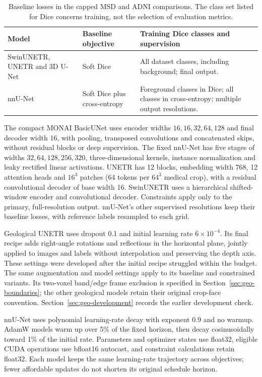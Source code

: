 \documentclass[12pt,a4paper]{article}
\begin{document}
\begin{table}[htbp]
\centering
\small
\begin{tabular}{P{4.3cm}P{3.2cm}P{6.0cm}}
\hline
Model & Baseline objective & Training Dice classes and supervision \\
\hline
SwinUNETR, UNETR and 3D U-Net
& Soft Dice
& All dataset classes, including background; final output. \\[0.5em]
nnU-Net
& Soft Dice plus cross-entropy
& Foreground classes in Dice; all classes in cross-entropy;
  multiple output resolutions. \\
\hline
\end{tabular}
\caption{Baseline losses in the capped MSD and ADNI comparisons. The class set
listed for Dice concerns training, not the selection of evaluation metrics.}
\label{tab:capped-baseline-losses}
\end{table}

The compact MONAI BasicUNet uses encoder widths $16,16,32,64,128$
and final decoder width 16, with pooling, transposed convolutions and
concatenated skips, without residual blocks or deep supervision.
The fixed nnU-Net has five stages of widths $32,64,128,256,320$,
three-dimensional kernels, instance normalization and leaky rectified
linear activations. UNETR has 12 blocks, embedding width 768, 12
attention heads and $16^3$ patches (64 tokens per $64^3$ medical crop),
with a residual convolutional decoder of base width 16. SwinUNETR
uses a hierarchical shifted-window encoder and convolutional decoder.
Constraints apply only to the primary, full-resolution output.
nnU-Net's other supervised resolutions keep their baseline losses, with
reference labels resampled to each grid.

Geological UNETR uses dropout 0.1 and initial learning rate
$6\times10^{-4}$. Its final recipe adds right-angle rotations and
reflections in the horizontal plane, jointly applied to images and
labels without interpolation and preserving the depth axis. These
settings were developed after the initial recipe struggled within the
budget. The same augmentation and model settings apply to its baseline
and constrained variants. Its two-voxel band/edge frame exclusion is
specified in Section~\ref{sec:geo-boundaries}; the other geological
models retain their original crop-face convention.
Section~\ref{sec:geo-development} records the earlier development check.

nnU-Net uses polynomial learning-rate decay with exponent 0.9 and no
warmup. AdamW models warm up over 5\% of the fixed horizon, then decay
cosinusoidally toward 1\% of the initial rate. Parameters and optimizer
states use float32, eligible CUDA operations use bfloat16 autocast,
and constraint calculations retain float32. Each model keeps the same
learning-rate trajectory across objectives; fewer affordable updates
do not shorten its original schedule horizon.
\end{document}
